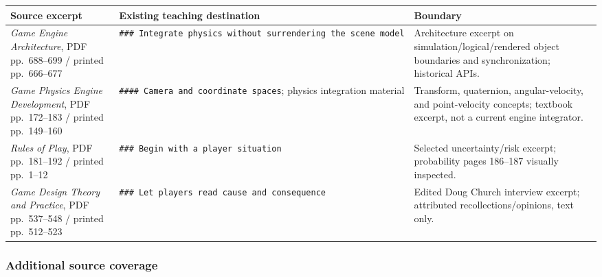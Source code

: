 {\def\LTcaptype{none} %
\begin{longtable}[]{@{}
  >{\raggedright\arraybackslash}p{}
  >{\raggedright\arraybackslash}p{}
  >{\raggedright\arraybackslash}p{}@{}}
\toprule\noalign{}
\begin{minipage}[b]{\linewidth}\raggedright
Source excerpt
\end{minipage} & \begin{minipage}[b]{\linewidth}\raggedright
Existing teaching destination
\end{minipage} & \begin{minipage}[b]{\linewidth}\raggedright
Boundary
\end{minipage} \\
\midrule\noalign{}
\endhead
\bottomrule\noalign{}
\endlastfoot
\emph{Game Engine Architecture}, PDF pp.~688--699 / printed pp.~666--677 & \texttt{\#\#\#\ Integrate\ physics\ without\ surrendering\ the\ scene\ model} & Architecture excerpt on simulation/logical/rendered object boundaries and synchronization; historical APIs. \\
\emph{Game Physics Engine Development}, PDF pp.~172--183 / printed pp.~149--160 & \texttt{\#\#\#\#\ Camera\ and\ coordinate\ spaces}; physics integration material & Transform, quaternion, angular-velocity, and point-velocity concepts; textbook excerpt, not a current engine integrator. \\
\emph{Rules of Play}, PDF pp.~181--192 / printed pp.~1--12 & \texttt{\#\#\#\ Begin\ with\ a\ player\ situation} & Selected uncertainty/risk excerpt; probability pages 186--187 visually inspected. \\
\emph{Game Design Theory and Practice}, PDF pp.~537--548 / printed pp.~512--523 & \texttt{\#\#\#\ Let\ players\ read\ cause\ and\ consequence} & Edited Doug Church interview excerpt; attributed recollections/opinions, text only. \\
\end{longtable}
}

\subsubsection{Additional source coverage}\label{appendix-877738f6f4d2-additional-source-coverage}

